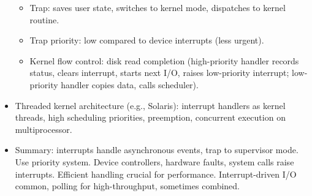 \begin{itemize}
\begin{itemize}
        \item Trap: saves user state, switches to kernel mode, dispatches to kernel routine.
        \item Trap priority: low compared to device interrupts (less urgent).
        \item Kernel flow control: disk read completion (high-priority handler records status, clears interrupt, starts next I/O, raises low-priority interrupt; low-priority handler copies data, calls scheduler).
    \end{itemize}
    \item Threaded kernel architecture (e.g., Solaris): interrupt handlers as kernel threads, high scheduling priorities, preemption, concurrent execution on multiprocessor.
    \item Summary: interrupts handle asynchronous events, trap to supervisor mode. Use priority system. Device controllers, hardware faults, system calls raise interrupts. Efficient handling crucial for performance. Interrupt-driven I/O common, polling for high-throughput, sometimes combined.
\end{itemize}

